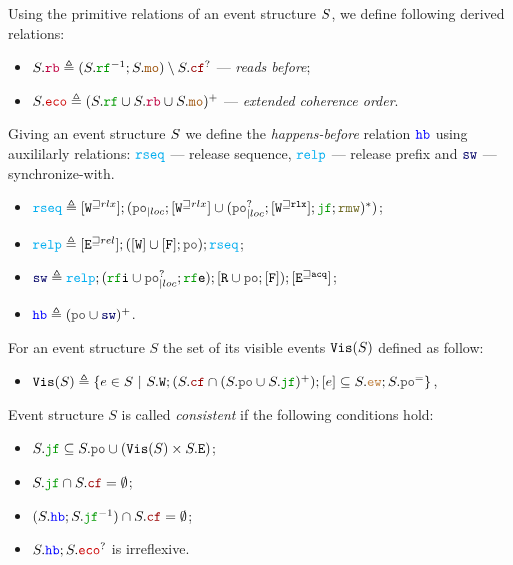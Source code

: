\documentclass[12pt]{article}
\begin{document}
\begin{definition}
  Using the primitive relations of an event structure $S$,
  we define following derived relations:
  \begin{itemize}
    \item $\lES.\lRB \defeq (\lES.\lRF^{-1};\lES.\lMO) \setminus \lES.\lCF^?$ --- 
      \emph{reads before};
    \item $\lES.\lECO \defeq (\lES.\lRF \cup \lES.\lRB \cup \lES.\lMO)^+$ --- 
      \emph{extended coherence order}.
  \end{itemize}
\end{definition}

\begin{definition}
  Giving an event structure $S$ we define the \emph{happens-before} relation $\lHB$
  using auxililarly relations: 
  $\lRSEQ$ --- release sequence,
  $\lRELP$ --- release prefix and
  $\lSW$ --- synchronize-with.
  \begin{itemize}
  \item $\lRSEQ \defeq [\lWsqeq{rlx}];(\lmakeLoc{\lPO};[\lWsqeq{rlx}] \cup 
    (\lmakeLoc{\lPO^?};[\lWsqeq{\rlx}];\lJF;\lRMW)^*)$;
  \item $\lRELP \defeq [\lEsqeq{rel}];([\lW] \cup [\lF];\lPO);\lRSEQ$;
  \item $\lSW \defeq \lRELP; (\lRFI \cup \lmakeLoc{\lPO^?};\lRFE); [\lR \cup \lPO;[\lF]);[\lEsqeq{\acq}]$;
  \item $\lHB \defeq (\lPO \cup \lSW)^+$.
  \end{itemize}
\end{definition}


\begin{definition}
  For an event structure $S$ the set of its visible events ${\mathtt{Vis}}(S)$ defined as follow:
  \begin{itemize}
    \item $\lVIS(S) \defeq 
      \{ e \in S ~|~ S.\lW;(S.\lCF \cap (S.\lPO \cup S.\lJF)^+);[e] \subseteq 
         S.\lEW;S.\lPO^=
      \}$,
  \end{itemize}
\end{definition}

\begin{definition}
  Event structure $S$ is called \emph{consistent} if the following conditions hold:
  
  \begin{itemize}

    \item $S.\lJF \subseteq S.\lPO \cup (\lVIS(S) \times S.\lE)$;

    \item $S.\lJF \cap S.\lCF = \emptyset$;

    \item $(S.\lHB;S.\lJF^{-1}) \cap S.\lCF = \emptyset$;

    \item $S.\lHB;S.\lECO^?$ is irreflexive.
  \end{itemize}
\end{definition}
\end{document}
